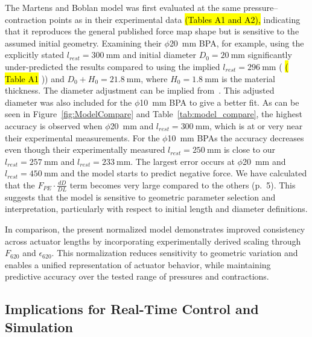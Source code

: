 \documentclass[actuators,article,accept,pdftex,moreauthors]{Definitions/mdpi}
\begin{document}
The Martens and Boblan model was first evaluated at the same pressure–contraction points as in their experimental data \citep{martens_modeling_2017} \hl{(Tables A1 and  A2),} %
 indicating that it reproduces the general published force map shape but is sensitive to the assumed initial geometry. %
  Examining their $\phi$\qty{20}{\mm} BPA, for example, using the explicitly stated $l_{rest}=\qty{300}{\mm}$ and initial diameter $D_{0}=\qty{20}{\mm}$ significantly under-predicted the results compared to using the implied $l_{rest}=\qty{296}{\mm}$ (\citep{martens_modeling_2017} \hl{(}%
\hl{Table A1}%
)) and $D_{0}+H_{0}=\qty{21.8}{\mm}$, where $H_{0}=\qty{1.8}{\mm}$ is the material thickness. The diameter adjustment can be implied \mbox{from \citep{chou_measurement_1996}.} This adjusted diameter was also included for the $\phi$\qty{10}{\mm} BPA to give a better fit. As can be seen in Figure~\ref{fig:ModelCompare} and Table~\ref{tab:model_compare}, the highest accuracy is observed when $\phi$\qty{20}{\mm} and $l_{rest}=\qty{300}{\mm}$, which is at or very near their experimental measurements. For the $\phi$\qty{10}{\mm} BPAs the accuracy decreases even though their experimentally measured $l_{rest}=\qty{250}{\mm}$ is close to our $l_{rest}=\qty{257}{\mm}$ and $l_{rest}=\qty{233}{\mm}$. The largest error occurs at $\phi$\qty{20}{\mm} and $l_{rest}=\qty{450}{\mm}$ and the model starts to predict negative force. We have calculated that the $F_{PE}\cdot\frac{dD}{DL}$ term becomes very large compared to the others \citep{martens_modeling_2017} (p.~5). This suggests that the model is sensitive to geometric parameter selection and interpretation, particularly with respect to initial length and diameter definitions.

In comparison, the present normalized model demonstrates improved consistency across actuator lengths by incorporating experimentally derived scaling through $F_{620}$ and $\epsilon_{620}$. This normalization reduces sensitivity to geometric variation and enables a unified representation of actuator behavior, while maintaining predictive accuracy over the tested range of pressures and contractions.

\subsection{Implications for Real-Time Control and Simulation}
\end{document}

